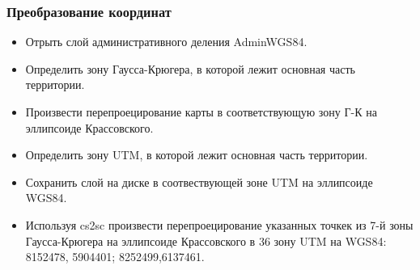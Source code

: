 
\begin{frame}
    \frametitle{Преобразование координат}
    \begin{itemize}
        \item Отрыть слой административного деления AdminWGS84.
        \item Определить зону Гаусса-Крюгера, в которой лежит основная часть территории.
        \item Произвести перепроецирование карты в соответствующую зону Г-К на эллипсоиде Крассовского.
        \item Определить зону UTM, в которой лежит основная часть территории.
        \item Сохранить слой на диске в соотвествующей зоне UTM на эллипсоиде WGS84.
        \item Используя cs2sc произвести перепроецирование указанных точкек из 7-й зоны Гаусса-Крюгера на эллипсоиде Крассовского
        в 36 зону UTM на WGS84: 8152478, 5904401; 8252499,6137461.
    \end{itemize}
\end{frame}
